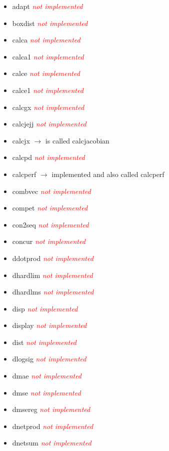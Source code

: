 \begin{itemize}
	\item adapt \textcolor{red}{\textit{not implemented}}
	\item boxdist \textcolor{red}{\textit{not implemented}}
	\item calca \textcolor{red}{\textit{not implemented}}
	\item calca1 \textcolor{red}{\textit{not implemented}}
	\item calce \textcolor{red}{\textit{not implemented}}
	\item calce1 \textcolor{red}{\textit{not implemented}}
	\item calcgx \textcolor{red}{\textit{not implemented}}
	\item calcjejj \textcolor{red}{\textit{not implemented}}
	\item calcjx  $\rightarrow$ is called calcjacobian
	\item calcpd \textcolor{red}{\textit{not implemented}}
	\item calcperf $\rightarrow$ implemented and also called calcperf
	\item combvec \textcolor{red}{\textit{not implemented}}
	\item compet \textcolor{red}{\textit{not implemented}}
	\item con2seq \textcolor{red}{\textit{not implemented}}
	\item concur \textcolor{red}{\textit{not implemented}}
	\item ddotprod \textcolor{red}{\textit{not implemented}}
	\item dhardlim \textcolor{red}{\textit{not implemented}}
	\item dhardlms \textcolor{red}{\textit{not implemented}}
	\item disp \textcolor{red}{\textit{not implemented}}
	\item display \textcolor{red}{\textit{not implemented}} 
	\item dist \textcolor{red}{\textit{not implemented}}
	\item dlogsig \textcolor{red}{\textit{not implemented}}
	\item dmae \textcolor{red}{\textit{not implemented}}
	\item dmse \textcolor{red}{\textit{not implemented}}
	\item dmsereg \textcolor{red}{\textit{not implemented}}
	\item dnetprod \textcolor{red}{\textit{not implemented}}
	\item dnetsum \textcolor{red}{\textit{not implemented}}

\end{itemize}

